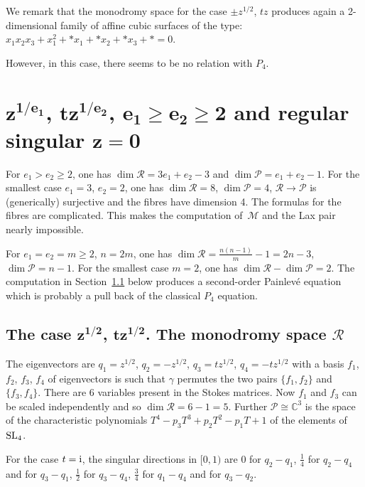 \documentclass[pdftex]{sigma}
\numberwithin{equation}{section}
\begin{document}
We remark that the monodromy space for the
case $\pm z^{1/2}$, $tz$ produces again a 2-dimensional family of affine cubic surfaces of the type:
$x_1x_2x_3+x_1^2+*x_1+*x_2+*x_3+*=0$.

However, in this case, there seems to be no relation with $P_4$.

 \section[e1-th root of z, t times e2-th root of z, e1 at least e2 at least 2 and regular singular z=0]{ $\boldsymbol{z^{1/e_1}}$, $\boldsymbol{tz^{1/e_2}}$, $\boldsymbol{e_1\geq e_2\geq 2}$ and regular singular $\boldsymbol{z=0}$}\label{five}

 For $e_1>e_2\geq 2$, one has $\dim \mathcal{R}=3e_1+e_2-3$ and $\dim \mathcal{P}=e_1+e_2-1$. For the smallest case $e_1=3$, $e_2=2$,
 one has $\dim \mathcal{R}=8$, $\dim \mathcal{P}=4$, $\mathcal{R}\rightarrow \mathcal{P}$ is
(generically) surjective and the fibres have dimension 4. The formulas for the fibres are
complicated. This makes the computation of~$\mathcal{M}$ and the Lax pair nearly impossible.

For $e_1=e_2=m\geq 2$, $ n=2m$, one has $\dim \mathcal{R}=\frac{n(n-1)}{m}-1=2n-3$, $\dim \mathcal{P}=n-1$.
For the smallest case $m=2$, one has $\dim \mathcal{R}-\dim \mathcal{P}=2$. The computation in Section~\ref{5.1} below produces a
second-order Painlev\'e equation which is probably a pull back of the classical $P_4$ equation.

\subsection[The case sqrt(z), t*sqrt(z). The monodromy space R]{The case $\boldsymbol{z^{1/2}}$, $\boldsymbol{tz^{1/2}}$. The monodromy space $\boldsymbol{\mathcal{R}}$}\label{5.1}

 The eigenvectors are $q_1=z^{1/2}$, $q_2=-z^{1/2}$, $q_3=tz^{1/2}$, $q_4=-tz^{1/2}$ with a basis $f_1$, $f_2$, $f_3$, $f_4$
 of eigenvectors is such that $\gamma$ permutes the two pairs $\{f_1,f_2\}$ and $\{f_3,f_4\}$. There are 6 variables present in the Stokes matrices. Now $f_1$ and $f_3$ can be scaled independently and so $\dim \mathcal{R}=6-1=5$. Further
 $\mathcal{P}\cong \mathbb{C}^3$ is the space of the characteristic polynomials $T^4-p_3T^3+p_2T^2-p_1T+1$ of
 the elements of ${\rm SL}_4$.

For the case $t={\rm i}$, the singular directions in $[0,1)$ are $0$ for $q_2-q_1$, $\frac{1}{4}$ for $q_2-q_4$ and for $q_3-q_1$,
$\frac{1}{2}$ for $q_3-q_4$, $\frac{3}{4}$ for $q_1-q_4$ and for $q_3-q_2$.
\end{document}
